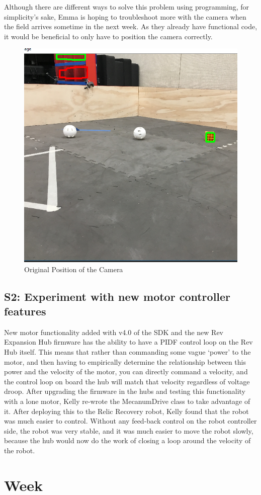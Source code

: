 \documentclass{article}
\begin{document}
Although there are different ways to solve this problem using programming, for simplicity's sake, Emma is hoping to troubleshoot more with the camera when the field arrives sometime in the next week. As they already have functional code, it would be beneficial to only have to position the camera correctly. 

\begin{figure}
    \centering
    \includegraphics[width=.6\textwidth]{02_09-10/images/originalcameraposition.png}
    \caption{Original Position of the Camera}
    \label{fig:camera}
\end{figure}



\subsection{S2: Experiment with new motor controller features}

New motor functionality added with v4.0 of the SDK and the new Rev Expansion Hub firmware has the ability to have a PIDF control loop on the Rev Hub itself. This means that rather than commanding some vague `power' to the motor, and then having to empirically determine the relationship between this power and the velocity of the motor, you can directly command a velocity, and the control loop on board the hub will match that velocity regardless of voltage droop. After upgrading the firmware in the hubs and testing this functionality with a lone motor, Kelly re-wrote the MecanumDrive class to take advantage of it. After deploying this to the Relic Recovery robot, Kelly found that the robot was much easier to control. Without any feed-back control on the robot controller side, the robot was very stable, and it was much easier to move the robot slowly, because the hub would now do the work of closing a loop around the velocity of the robot.\clearpage \newpage \section{Week \thesection} 
\end{document}
